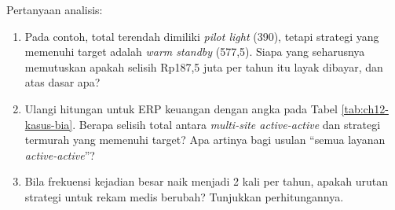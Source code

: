 Pertanyaan analisis:
\begin{enumerate}
  \item Pada contoh, total terendah dimiliki \textit{pilot light} (390), tetapi strategi yang
        memenuhi target adalah \textit{warm standby} (577,5). Siapa yang seharusnya memutuskan
        apakah selisih Rp187,5 juta per tahun itu layak dibayar, dan atas dasar apa?
  \item Ulangi hitungan untuk ERP keuangan dengan angka pada Tabel \ref{tab:ch12-kasus-bia}. Berapa
        selisih total antara \textit{multi-site active-active} dan strategi termurah yang memenuhi
        target? Apa artinya bagi usulan ``semua layanan \textit{active-active}''?
  \item Bila frekuensi kejadian besar naik menjadi 2 kali per tahun, apakah urutan strategi untuk
        rekam medis berubah? Tunjukkan perhitungannya.
\end{enumerate}
